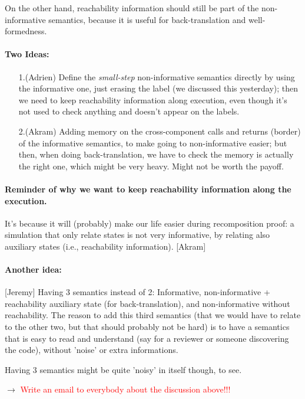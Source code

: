\documentclass[12pt,a4paper]{article}
\newcommand{\todo}[1]{$\rightarrow$ \textcolor{red}{#1}}
\begin{document}
On the other hand, reachability information should still be part of the 
non-informative semantics, because it is useful for 
back-translation and well-formedness.

\paragraph{Two Ideas:}
\begin{enumerate}
\item [1.(Adrien)] Define the \emph{small-step} non-informative semantics directly by using 
the informative one, just erasing the label (we discussed this yesterday); then 
we need to keep reachability information along execution, even though it's not used 
to check anything and doesn't appear on the labels.
\item [2.(Akram)] Adding memory on the cross-component calls and returns (border) of 
the informative semantics, to make 
going to non-informative easier; but then, when doing back-translation, 
we have to check the memory is actually the right one, which might be 
very heavy. Might not be worth the payoff.
\end{enumerate}


\paragraph{Reminder of why we want to keep reachability information along the execution.} 
It's because it will (probably) make our life easier during recomposition proof: 
a simulation that only relate states is not very informative, by relating also 
auxiliary states (i.e., reachability information). [Akram]

\paragraph{Another idea:} [Jeremy]
Having 3 semantics instead of 2: 
Informative, non-informative + reachability auxiliary state (for back-translation), 
and non-informative without reachability. The reason to add this third semantics (that 
we would have to relate to the other two, but that should probably not be hard) 
is to have a semantics that is easy to read and understand (say for a reviewer or 
someone discovering the code), without 'noise' or extra 
informations.

Having 3 semantics might be quite 'noisy' in itself though, to see.

\todo{Write an email to everybody about the discussion above!!!}
\end{document}
